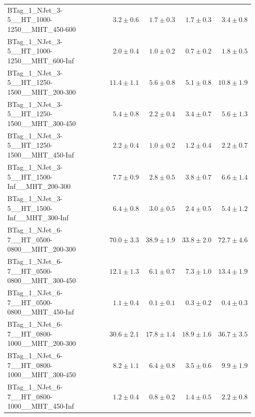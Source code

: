 \documentclass{beamer}
\begin{document}
\begin{frame}
\begin{tabular}{lrrrr}
      BTag\_1\_NJet\_3-5\_\_HT\_1000-1250\_\_MHT\_450-600 &               $3.2\pm0.6$&               $1.7\pm0.3$&               $1.7\pm0.3$&                   $3.4\pm0.8$ \\ 
      BTag\_1\_NJet\_3-5\_\_HT\_1000-1250\_\_MHT\_600-Inf &               $2.0\pm0.4$&               $1.0\pm0.2$&               $0.7\pm0.2$&                   $1.8\pm0.5$ \\ 
      BTag\_1\_NJet\_3-5\_\_HT\_1250-1500\_\_MHT\_200-300 &              $11.4\pm1.1$&               $5.6\pm0.8$&               $5.1\pm0.8$&                  $10.8\pm1.9$ \\ 
      BTag\_1\_NJet\_3-5\_\_HT\_1250-1500\_\_MHT\_300-450 &               $5.4\pm0.8$&               $2.2\pm0.4$&               $3.4\pm0.7$&                   $5.6\pm1.3$ \\ 
      BTag\_1\_NJet\_3-5\_\_HT\_1250-1500\_\_MHT\_450-Inf &               $2.2\pm0.4$&               $1.0\pm0.2$&               $1.2\pm0.4$&                   $2.2\pm0.7$ \\ 
       BTag\_1\_NJet\_3-5\_\_HT\_1500-Inf\_\_MHT\_200-300 &               $7.7\pm0.9$&               $2.8\pm0.5$&               $3.8\pm0.7$&                   $6.6\pm1.4$ \\ 
       BTag\_1\_NJet\_3-5\_\_HT\_1500-Inf\_\_MHT\_300-Inf &               $6.4\pm0.8$&               $3.0\pm0.5$&               $2.4\pm0.5$&                   $5.4\pm1.2$ \\ 
      BTag\_1\_NJet\_6-7\_\_HT\_0500-0800\_\_MHT\_200-300 &              $70.0\pm3.3$&              $38.9\pm1.9$&              $33.8\pm2.0$&                  $72.7\pm4.6$ \\ 
      BTag\_1\_NJet\_6-7\_\_HT\_0500-0800\_\_MHT\_300-450 &              $12.1\pm1.3$&               $6.1\pm0.7$&               $7.3\pm1.0$&                  $13.4\pm1.9$ \\ 
      BTag\_1\_NJet\_6-7\_\_HT\_0500-0800\_\_MHT\_450-Inf &               $1.1\pm0.4$&               $0.1\pm0.1$&               $0.3\pm0.2$&                   $0.4\pm0.3$ \\ 
      BTag\_1\_NJet\_6-7\_\_HT\_0800-1000\_\_MHT\_200-300 &              $30.6\pm2.1$&              $17.8\pm1.4$&              $18.9\pm1.6$&                  $36.7\pm3.5$ \\ 
      BTag\_1\_NJet\_6-7\_\_HT\_0800-1000\_\_MHT\_300-450 &               $8.2\pm1.1$&               $6.4\pm0.8$&               $3.5\pm0.6$&                   $9.9\pm1.9$ \\ 
      BTag\_1\_NJet\_6-7\_\_HT\_0800-1000\_\_MHT\_450-Inf &               $1.2\pm0.4$&               $0.8\pm0.2$&               $1.4\pm0.5$&                   $2.2\pm0.8$ \\ 

\end{tabular}
\end{frame}
\end{document}
